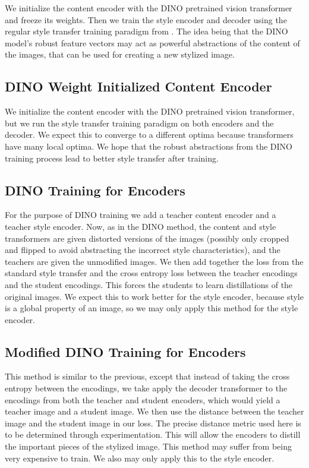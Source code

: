 \documentclass{article}
\begin{document}
We initialize the content encoder with the DINO pretrained vision transformer and freeze its weights. Then we train the style encoder and decoder using the regular style transfer training paradigm from \cite{ImageStyleTransformer}. The idea being that the DINO model's robust feature vectors may act as powerful abstractions of the content of the images, that can be used for creating a new stylized image.

\subsection{DINO Weight Initialized Content Encoder}

We initialize the content encoder with the DINO pretrained vision transformer, but we run the style transfer training paradigm on both encoders and the decoder. We expect this to converge to a different optima because transformers have many local optima. We hope that the robust abstractions from the DINO training process lead to better style transfer after training.

\subsection{DINO Training for Encoders}

For the purpose of DINO training we add a teacher content encoder and a teacher style encoder. Now, as in the DINO method, the content and style transformers are given distorted versions of the images (possibly only cropped and flipped to avoid abstracting the incorrect style characteristics), and the teachers are given the unmodified images. We then add together the loss from the standard style transfer and the cross entropy loss between the teacher encodings and the student encodings. This forces the students to learn distillations of the original images. We expect this to work better for the style encoder, because style is a global property of an image, so we may only apply this method for the style encoder.

\subsection{Modified DINO Training for Encoders}

This method is similar to the previous, except that instead of taking the cross entropy between the encodings, we take apply the decoder transformer to the encodings from both the teacher and student encoders, which would yield a teacher image and a student image. We then use the distance between the teacher image and the student image in our loss. The precise distance metric used here is to be determined through experimentation. This will allow the encoders to distill the important pieces of the stylized image. This method may suffer from being very expensive to train. We also may only apply this to the style encoder.

\medskip

\nocite{*}


\end{document}
